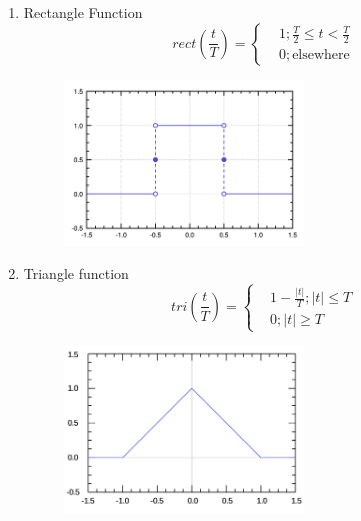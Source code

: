 \begin{enumerate}
\begin{figure}[h]
        \label{fig:enter-label}
    \end{figure}
    \newpage    
    \item Rectangle Function
    \begin{equation}
    rect(\frac{t}{T}) = 
        \begin{cases}
            & 1; \frac{T}{2}\leq t < \frac{T}{2} \\
            & 0; \text{elsewhere}
        \end{cases}
    \end{equation}
    \begin{figure}[h]
        \centering
        \includegraphics[width=0.6\textwidth]{image/1920px-Rectangular_function.svg.png}
        \label{fig:enter-label}
    \end{figure}
    \item Triangle function
    \begin{equation}
    tri(\frac{t}{T}) = 
        \begin{cases}
            & 1-\frac{|t|}{T};  |t|\leq T \\
            & 0;                |t|\geq T
        \end{cases}
    \end{equation}
    \begin{figure}[h]
        \centering
        \includegraphics[width=0.6\textwidth]{image/Triangular_function.svg.png}
        \label{fig:enter-label}
    \end{figure}

\end{enumerate}
